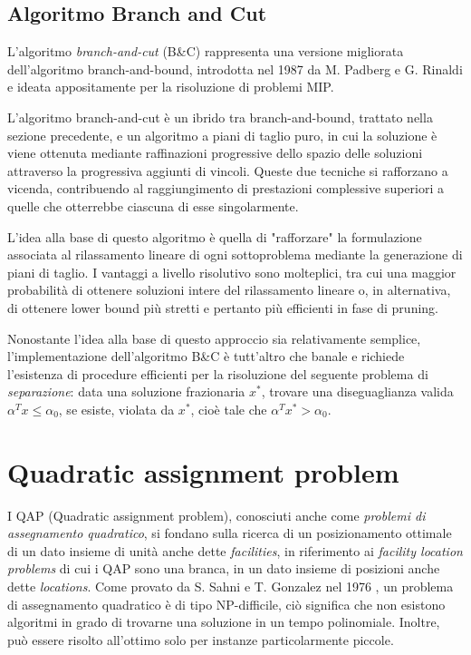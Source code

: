 \subsection{Algoritmo Branch and Cut}
L'algoritmo \textit{branch-and-cut} (B\&C) rappresenta una versione migliorata dell'algoritmo branch-and-bound, introdotta nel 1987
da M. Padberg e G. Rinaldi \cite{PADBERG19871} e ideata appositamente per la risoluzione di problemi MIP. 

L'algoritmo branch-and-cut è un ibrido tra branch-and-bound, trattato nella sezione precedente, e un algoritmo
a piani di taglio puro, in cui la soluzione è viene ottenuta mediante raffinazioni progressive dello spazio delle soluzioni attraverso la
progressiva aggiunti di vincoli.
Queste due tecniche si rafforzano a vicenda, contribuendo al raggiungimento di prestazioni complessive superiori a quelle
che otterrebbe ciascuna di esse singolarmente.

L'idea alla base di questo algoritmo è quella di "rafforzare" la formulazione associata al rilassamento lineare di ogni sottoproblema 
mediante la generazione di piani di taglio. I vantaggi a livello risolutivo sono molteplici, tra cui una maggior probabilità di
ottenere soluzioni intere del rilassamento lineare o, in alternativa, di ottenere lower bound più stretti e pertanto più efficienti in 
fase di pruning. 

Nonostante l'idea alla base di questo approccio sia relativamente semplice, l'implementazione dell'algoritmo B\&C è tutt'altro che
banale e richiede l'esistenza di procedure efficienti per la risoluzione del seguente problema di \textsl{separazione}: data una
soluzione frazionaria {$x^*$}, trovare una diseguaglianza valida $\alpha^Tx\leq \alpha_0$, se esiste, violata da $x^*$, cioè
tale che $\alpha^Tx^*>\alpha_0$.

\section{Quadratic assignment problem}
I QAP (Quadratic assignment problem), conosciuti anche come \textit{problemi di assegnamento quadratico}, si fondano sulla ricerca
di un posizionamento ottimale di un dato insieme di unità anche dette \textit{facilities}, in riferimento ai \textit{facility location problems}
di cui i QAP sono una branca, in un dato insieme di posizioni anche dette \textit{locations}. 
Come provato da S. Sahni e T. Gonzalez nel 1976 \cite{SAHNI1976}, un problema di assegnamento quadratico è di tipo NP-difficile, 
ciò significa che non esistono algoritmi in grado di trovarne una soluzione in un tempo polinomiale. 
Inoltre, può essere risolto all'ottimo solo per instanze particolarmente piccole.

